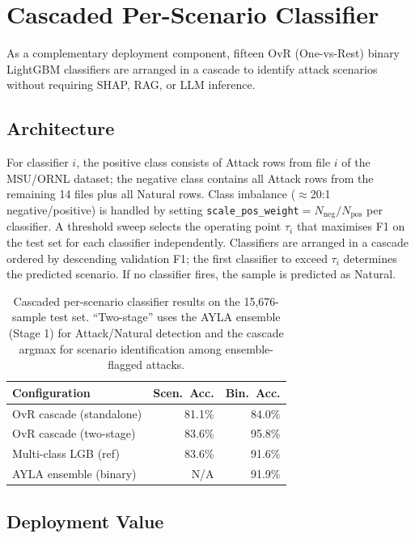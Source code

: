 \documentclass[twocolumn, 10pt, letterpaper]{article}
\begin{document}
\section{Cascaded Per-Scenario Classifier}
\label{app:cascade}

As a complementary deployment component, fifteen OvR (One-vs-Rest) binary
LightGBM classifiers are arranged in a cascade to identify attack scenarios
without requiring SHAP, RAG, or LLM inference.

\subsection*{Architecture}

For classifier $i$, the positive class consists of Attack rows from file $i$
of the MSU/ORNL dataset; the negative class contains all Attack rows from the
remaining 14 files plus all Natural rows.
Class imbalance ($\approx$20:1 negative/positive) is handled by
setting \texttt{scale\_pos\_weight}$= N_\text{neg}/N_\text{pos}$ per classifier.
A threshold sweep selects the operating point $\tau_i$ that maximises F1 on the
test set for each classifier independently.
Classifiers are arranged in a cascade ordered by descending validation F1;
the first classifier to exceed $\tau_i$ determines the predicted scenario.
If no classifier fires, the sample is predicted as Natural.

\begin{table}[H]
\centering
\caption{Cascaded per-scenario classifier results on the 15,676-sample test set.
         ``Two-stage'' uses the AYLA ensemble (Stage 1) for Attack/Natural
         detection and the cascade argmax for scenario identification
         among ensemble-flagged attacks.}
\label{tab:cascade}
\footnotesize
\begin{tabular}{lrr}
\toprule
\textbf{Configuration} & \textbf{Scen.\ Acc.} & \textbf{Bin.\ Acc.} \\
\midrule
OvR cascade (standalone)  & 81.1\% & 84.0\% \\
OvR cascade (two-stage)   & 83.6\% & 95.8\% \\
Multi-class LGB (ref)     & 83.6\% & 91.6\% \\
\midrule
AYLA ensemble (binary)    & N/A    & 91.9\% \\
\bottomrule
\end{tabular}
\end{table}

\subsection*{Deployment Value}
\end{document}

